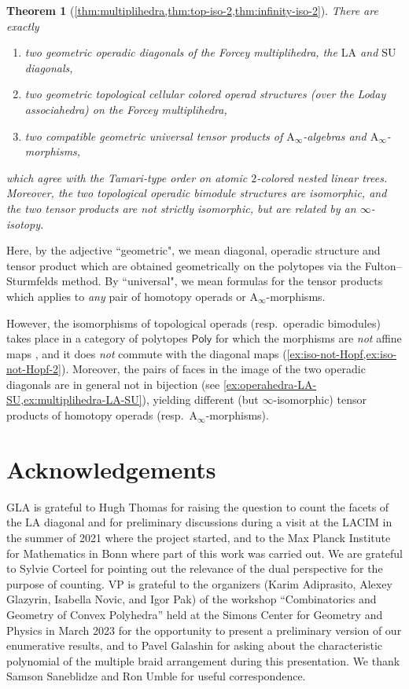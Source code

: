 \documentclass{amsart}
\newtheorem*{theorem*}{Theorem}
\theoremstyle{definition}
\newcommand{\resp}{resp.~} %
\newcommand{\SU}{\mathrm{SU}}
\newcommand{\LA}{\mathrm{LA}}
\newcommand{\PolySub}{\mathsf{Poly}}
\newcommand{\Ainf}{\ensuremath{\mathrm{A}_\infty}}
\begin{document}
\begin{theorem*}[{\cref{thm:multiplihedra,thm:top-iso-2,thm:infinity-iso-2}}]
	There are exactly 
	\begin{enumerate}
	\item two geometric operadic diagonals of the Forcey multiplihedra, the $\LA$ and $\SU$ diagonals,
	\item two geometric topological cellular colored operad structures (over the Loday associahedra) on the Forcey multiplihedra,
	\item two compatible geometric universal tensor products of $\Ainf$-algebras and $\Ainf$-morphisms,
	\end{enumerate}
	which agree with the Tamari-type order on atomic $2$-colored nested linear trees. 
	Moreover, the two topological operadic bimodule structures are isomorphic, and the two tensor products are not strictly isomorphic, but are related by an $\infty$-isotopy. 
\end{theorem*}

Here, by the adjective ``geometric", we mean diagonal, operadic structure and tensor product which are obtained geometrically on the polytopes via the Fulton--Sturmfelds method. 
By ``universal", we mean formulas for the tensor products which applies to \emph{any} pair of homotopy operads or $\Ainf$-morphisms.

However, the isomorphisms of topological operads (\resp operadic bimodules) takes place in a category of polytopes $\PolySub$ for which the morphisms are \emph{not} affine maps \cite[Def. 4.13]{LaplanteAnfossi}, and it does \emph{not} commute with the diagonal maps (\cref{ex:iso-not-Hopf,ex:iso-not-Hopf-2}).
Moreover, the pairs of faces in the image of the two operadic diagonals are in general not in bijection (see \cref{ex:operahedra-LA-SU,ex:multiplihedra-LA-SU}), yielding different (but $\infty$-isomorphic) tensor products of homotopy operads (\resp $\Ainf$-morphisms).  


\section*{Acknowledgements}

GLA is grateful to Hugh Thomas for raising the question to count the facets of the $\LA$ diagonal and for preliminary discussions during a visit at the LACIM in the summer of 2021 where the project started, and to the Max Planck Institute for Mathematics in Bonn where part of this work was carried out.
We are grateful to Sylvie Corteel for pointing out the relevance of the dual perspective for the purpose of counting.
VP is grateful to the organizers (Karim Adiprasito, Alexey Glazyrin, Isabella Novic, and Igor Pak) of the workshop ``Combinatorics and Geometry of Convex Polyhedra'' held at the Simons Center for Geometry and Physics in March 2023 for the opportunity to present a preliminary version of our enumerative results, and to  Pavel Galashin for asking about the characteristic polynomial of the multiple braid arrangement during this presentation.
We thank Samson Saneblidze and Ron Umble for useful correspondence.
\end{document}
